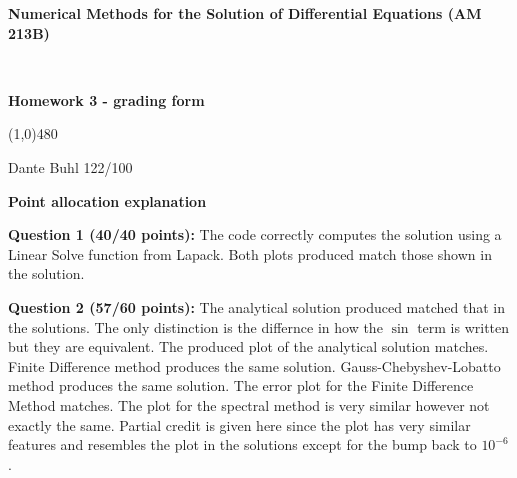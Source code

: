 \documentclass[10pt,english]{article}
\def\vss{\vspace{1cm}}
\def\vs{\vspace{0.2cm}}
\begin{document}
\noindent
\centerline{
\textbf{\large Numerical Methods for the Solution of Differential Equations (AM 213B)}}\\
\centerline{{\bf Homework 3 - grading form}}
%
\centerline{\line(1,0){480}}\vspace{.cm}

\vspace{0.2cm}
 Dante Buhl
\vs
{} 122/100

\vss\noindent
\centerline{\bf Point allocation explanation}


\vs
{\bf Question 1 (40/40 points):} The code correctly computes the solution using
a Linear Solve function from Lapack. Both plots produced match those shown in
the solution. 

\vs   
{\bf Question 2 (57/60 points):} The analytical solution produced matched that in
the solutions. The only distinction is the differnce in how the $\sin$ term is
written but they are equivalent. The produced plot of the analytical solution
matches. Finite Difference method produces the same solution.
Gauss-Chebyshev-Lobatto method produces the same solution. The error plot for
the Finite Difference Method matches. The plot for the spectral method is very
similar however not exactly the same. Partial credit is given here since the
plot has very similar features and resembles the plot in the solutions except
for the bump back to $10^{-6}$. 
\end{document}
